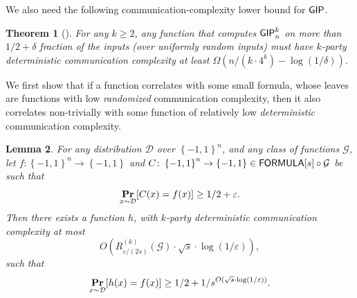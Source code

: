 \documentclass[10pt,a4paper]{article}
\newtheorem{theorem}{Theorem}
\newtheorem{lemma}[theorem]{Lemma}
\DeclareMathOperator*\Prob{{\bf Pr}}
\newcommand{\boolpm}{\left\{-1,1\right\}}
\newcommand{\FORMULA}{{\sf FORMULA}}
\newcommand{\GIP}{{\sf GIP}}
\begin{document}
    We also need the following communication-complexity lower bound for $\GIP$.
    
    \begin{theorem}[{\cite[Theorem 2]{BNS92}}]\label{thm:lb-GIP-bound}
        For any $k\geq 2$, any function that computes $\GIP_{n}^{k}$ on more than $1/2+\delta$ fraction of the inputs (over uniformly random inputs) must have $k$-party deterministic communication complexity at least $\Omega \! \left(n/(k \cdot 4^k) - \log(1/\delta)\right)$.
    \end{theorem}
    
    We first show that if a function correlates with some small formula, whose leaves are functions with low \emph{randomized} communication complexity, then it also correlates non-trivially with some function of relatively low \emph{deterministic} communication complexity.
    
    \begin{lemma}\label{thm:lb-proof-1}
        For any distribution $\mathcal{D}$ over $\boolpm^n$, and any class of functions $\mathcal{G}$, let $f\colon\boolpm^n\to\boolpm$ and $C\colon\boolpm^n\to\boolpm\in \FORMULA[s]\circ\mathcal{G}$ be such that 
	    \[
	        \Prob_{x\sim\mathcal{D}}[C(x)=f(x)]\geq 1/2+\varepsilon.
	    \]
	    Then there exists a function $h$, with $k$-party deterministic communication complexity at most
	    \[
	        O\left(R^{(k)}_{\varepsilon/(2s)}(\mathcal{G})\cdot\sqrt{s}\cdot\log(1/\varepsilon)\right),
	    \]
	    such that
	    \[
	        \Prob_{x\sim\mathcal{D}}[h(x)=f(x)]\geq 1/2+1/s^{O(\sqrt{s}\cdot\log(1/\varepsilon))}.
	    \]
    \end{lemma}
    
\end{document}

